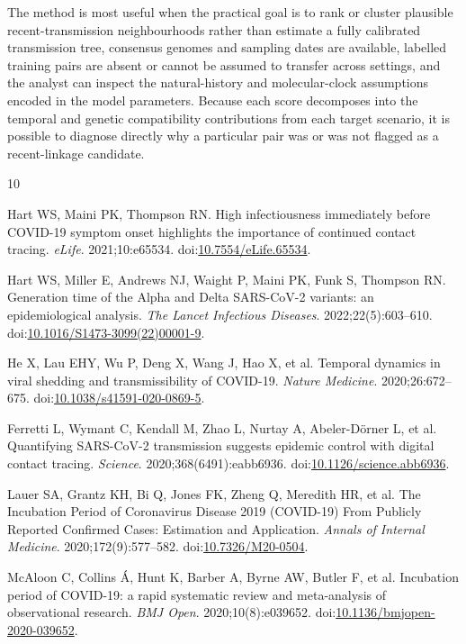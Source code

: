 \documentclass[11pt,a4paper]{article}
\begin{document}
The method is most useful when the practical goal is to rank or cluster plausible recent-transmission neighbourhoods rather than estimate a fully calibrated transmission tree, consensus genomes and sampling dates are available, labelled training pairs are absent or cannot be assumed to transfer across settings, and the analyst can inspect the natural-history and molecular-clock assumptions encoded in the model parameters. Because each score decomposes into the temporal and genetic compatibility contributions from each target scenario, it is possible to diagnose directly why a particular pair was or was not flagged as a recent-linkage candidate.

\begin{thebibliography}{10}

Hart WS, Maini PK, Thompson RN.
High infectiousness immediately before COVID-19 symptom onset highlights the importance of continued contact tracing.
\textit{eLife}. 2021;10:e65534.
doi:\href{https://doi.org/10.7554/eLife.65534}{10.7554/eLife.65534}.

Hart WS, Miller E, Andrews NJ, Waight P, Maini PK, Funk S, Thompson RN.
Generation time of the Alpha and Delta SARS-CoV-2 variants: an epidemiological analysis.
\textit{The Lancet Infectious Diseases}. 2022;22(5):603--610.
doi:\href{https://doi.org/10.1016/S1473-3099(22)00001-9}{10.1016/S1473-3099(22)00001-9}.

He X, Lau EHY, Wu P, Deng X, Wang J, Hao X, et al.
Temporal dynamics in viral shedding and transmissibility of COVID-19.
\textit{Nature Medicine}. 2020;26:672--675.
doi:\href{https://doi.org/10.1038/s41591-020-0869-5}{10.1038/s41591-020-0869-5}.

Ferretti L, Wymant C, Kendall M, Zhao L, Nurtay A, Abeler-D{\"o}rner L, et al.
Quantifying SARS-CoV-2 transmission suggests epidemic control with digital contact tracing.
\textit{Science}. 2020;368(6491):eabb6936.
doi:\href{https://doi.org/10.1126/science.abb6936}{10.1126/science.abb6936}.

Lauer SA, Grantz KH, Bi Q, Jones FK, Zheng Q, Meredith HR, et al.
The Incubation Period of Coronavirus Disease 2019 (COVID-19) From Publicly Reported Confirmed Cases: Estimation and Application.
\textit{Annals of Internal Medicine}. 2020;172(9):577--582.
doi:\href{https://doi.org/10.7326/M20-0504}{10.7326/M20-0504}.

McAloon C, Collins \'{A}, Hunt K, Barber A, Byrne AW, Butler F, et al.
Incubation period of COVID-19: a rapid systematic review and meta-analysis of observational research.
\textit{BMJ Open}. 2020;10(8):e039652.
doi:\href{https://doi.org/10.1136/bmjopen-2020-039652}{10.1136/bmjopen-2020-039652}.


\end{thebibliography}
\end{document}
